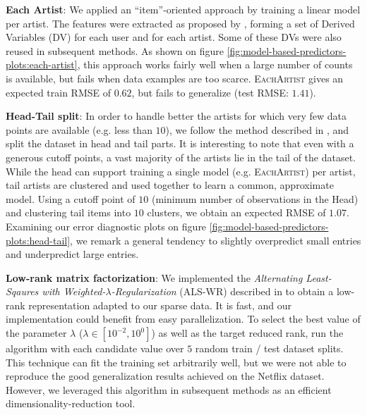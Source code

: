 \documentclass[10pt,a4paper]{article}
\begin{document}
    \noindent
    \textbf{Each Artist}: We applied an ``item''-oriented approach by training a linear model per artist. The features were extracted as proposed by \cite{long-tail-recommender}, forming a set of Derived Variables (DV) for each user and for each artist. Some of these DVs were also reused in subsequent methods. As shown on figure \ref{fig:model-based-predictors-plots:each-artist}, this approach works fairly well when a large number of counts is available, but fails when data examples are too scarce. \textsc{EachArtist} gives an expected train RMSE of $0.62$, but fails to generalize (test RMSE: $1.41$).

    \noindent
    \textbf{Head-Tail split}: In order to handle better the artists for which very few data points are available (e.g. less than $10$), we follow the method described in \cite{long-tail-recommender}, and split the dataset in head and tail parts. It is interesting to note that even with a generous cutoff points, a vast majority of the artists lie in the tail of the dataset. While the head can support training a single model (e.g. \textsc{EachArtist}) per artist, tail artists are clustered and used together to learn a common, approximate model. Using a cutoff point of $10$ (minimum number of observations in the Head) and clustering tail items into $10$ clusters, we obtain an expected RMSE of $1.07$. Examining our error diagnostic plots on figure \ref{fig:model-based-predictors-plots:head-tail}, we remark a general tendency to slightly overpredict small entries and underpredict large entries.

    \noindent
    \textbf{Low-rank matrix factorization}: We implemented the \textit{Alternating Least-Sqaures with Weighted-$\lambda$-Regularization} (ALS-WR) described in \cite{alswr} to obtain a low-rank representation adapted to our sparse data. It is fast, and our implementation could benefit from easy parallelization. To select the best value of the parameter $\lambda$ ($\lambda \in [10^{-2},10^0]$) as well as the target reduced rank, run the algorithm with each candidate value over $5$ random train / test dataset splits. This technique can fit the training set arbitrarily well, but we were not able to reproduce the good generalization results achieved \cite{alswr} on the Netflix dataset. However, we leveraged this algorithm in subsequent methods as an efficient dimensionality-reduction tool.
\end{document}

